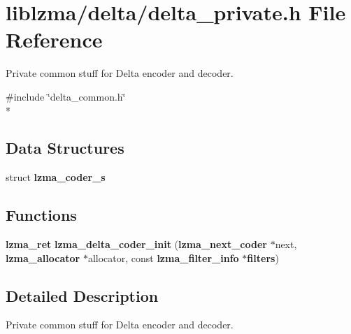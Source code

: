 \section{liblzma/delta/delta\-\_\-private.h File Reference}
\label{delta__private_8h}


Private common stuff for Delta encoder and decoder.  


{\ttfamily \#include \char`\"{}delta\-\_\-common.\-h\char`\"{}}\\*
\subsection*{Data Structures}
\begin{DoxyCompactItemize}
\item 
struct {\bf lzma\-\_\-coder\-\_\-s}
\end{DoxyCompactItemize}
\subsection*{Functions}
\begin{DoxyCompactItemize}
\item 
{\bf lzma\-\_\-ret} {\bfseries lzma\-\_\-delta\-\_\-coder\-\_\-init} ({\bf lzma\-\_\-next\-\_\-coder} $\ast$next, {\bf lzma\-\_\-allocator} $\ast$allocator, const {\bf lzma\-\_\-filter\-\_\-info} $\ast${\bf filters})\label{delta__private_8h_a1a991cc15922568d41b5f79ba47a27ba}

\end{DoxyCompactItemize}


\subsection{Detailed Description}
Private common stuff for Delta encoder and decoder. 